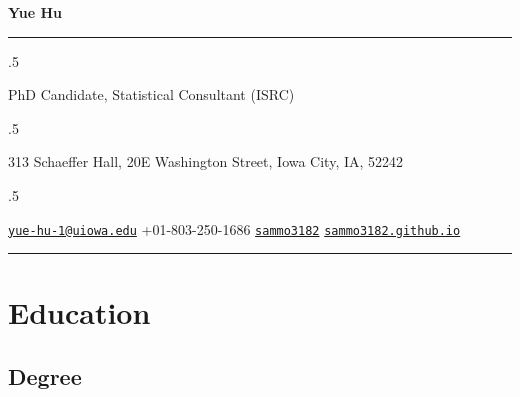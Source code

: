 \documentclass[10.5pt,]{article}
\begin{document}
\centerline{\huge \bf Yue Hu}

\vspace{2 mm}

\hrule

\vspace{2 mm}

\moveleft.5\hoffset\centerline{PhD Candidate, Statistical Consultant (ISRC)}
\moveleft.5\hoffset\centerline{313 Schaeffer Hall, 20E Washington Street, Iowa City, IA, 52242}
\moveleft.5\hoffset\centerline{ \faEnvelopeO \hspace{1 mm} \href{mailto:}{\tt \href{mailto:yue-hu-1@uiowa.edu}{\nolinkurl{yue-hu-1@uiowa.edu}}} \hspace{1 mm}  \faPhone \hspace{1 mm}  +01-803-250-1686  \hspace{1 mm}  \faGithub \hspace{1 mm} \href{http://github.com/sammo3182}{\tt sammo3182} \hspace{1 mm}    \faGlobe \hspace{1 mm} \href{http://sammo3182.github.io}{\tt sammo3182.github.io}   }

\vspace{2 mm}

\hrule


\section{Education}\label{education}

\subsection{Degree}\label{degree}
\end{document}
